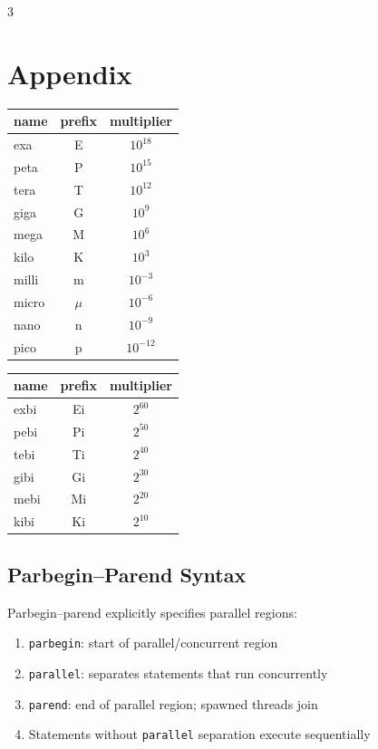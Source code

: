 \documentclass[12pt, a4paper]{article}
\begin{document}
\begin{multicols*}{3}
\section*{Appendix}
\begin{minipage}{0.48\linewidth}
\centering
\begin{tabular}{|l c c|}
\hline
\textbf{name} & \textbf{prefix} & \textbf{multiplier} \\
\hline
exa  & E  & $10^{18}$ \\
peta & P  & $10^{15}$ \\
tera & T  & $10^{12}$ \\
giga & G  & $10^{9}$  \\
mega & M  & $10^{6}$  \\
kilo & K  & $10^{3}$  \\
\hline
milli & m  & $10^{-3}$ \\
micro & $\mu$ & $10^{-6}$ \\
nano  & n  & $10^{-9}$ \\
pico  & p  & $10^{-12}$ \\
\hline
\end{tabular}
\end{minipage}\hfill
\begin{minipage}{0.48\linewidth}
\centering
\begin{tabular}{|l c c|}
\hline
\textbf{name} & \textbf{prefix} & \textbf{multiplier} \\
\hline
exbi & Ei & $2^{60}$ \\
pebi & Pi & $2^{50}$ \\
tebi & Ti & $2^{40}$ \\
gibi & Gi & $2^{30}$ \\
mebi & Mi & $2^{20}$ \\
kibi & Ki & $2^{10}$ \\
\hline
\end{tabular}
\end{minipage}

\subsection{Parbegin--Parend Syntax}

Parbegin--parend explicitly specifies parallel regions:
\begin{enumerate}[\roman*.]
  \item \lstinline|parbegin|: start of parallel/concurrent region
  \item \lstinline|parallel|: separates statements that run concurrently
  \item \lstinline|parend|: end of parallel region; spawned threads join
  \item Statements without \lstinline|parallel| separation execute sequentially
\end{enumerate}


\end{multicols*}
\end{document}
